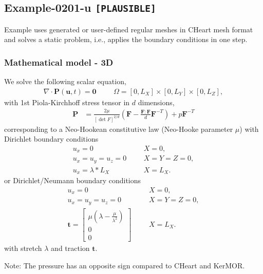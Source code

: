 %
\clearpage
%
\subsection{Example-0201-u \texttt{[PLAUSIBLE]}}
%
Example uses generated or user-defined regular meshes in CHeart mesh format
and solves a static problem, i.e., applies the boundary conditions in one step.\\[3ex]
%
%
\subsubsection{Mathematical model - 3D}
%
We solve the following scalar equation,
%
\begin{align}
    \nabla \cdot \boldsymbol{P} (\boldsymbol{u}, t) = \boldsymbol{0} & &&\Omega = [0, L_X] \times [0, L_Y] \times [0, L_Z],
\end{align}
%
with 1st Piola-Kirchhoff stress tensor in $d$ dimensions,
%
\begin{align}
    \boldsymbol{P} &= \frac{2 \mu}{[\det F]^{2/d}} \left( \boldsymbol{F} - \frac{\boldsymbol{F} : \boldsymbol{F}}{d} \boldsymbol{F}^{-T} \right) + p \boldsymbol{F}^{-T}
\end{align}
%
corresponding to a Neo-Hookean constitutive law (Neo-Hooke parameter $\mu$)
with Dirichlet boundary conditions
%
\begin{align}
    u_x = 0 & &&X = 0, \\
    u_x = u_y = u_z = 0 & && X = Y = Z = 0, \\
		u_x = \lambda * L_X & &&X = L_X.
\end{align}
%
or Dirichlet/Neumann boundary conditions
%
\begin{align}
    u_x = 0 & &&X = 0, \\
    u_x = u_y = u_z = 0 & && X = Y = Z = 0, \\
		\boldsymbol{t} = \begin{bmatrix}
		  \mu (\lambda - \frac{\mu}{\lambda^2}) \\
		  0 \\
		  0
		\end{bmatrix} & &&X = L_X.
\end{align}
%
with stretch $\lambda$ and traction $\boldsymbol{t}$.

Note: The pressure has an opposite sign compared to CHeart and KerMOR.
%
%
